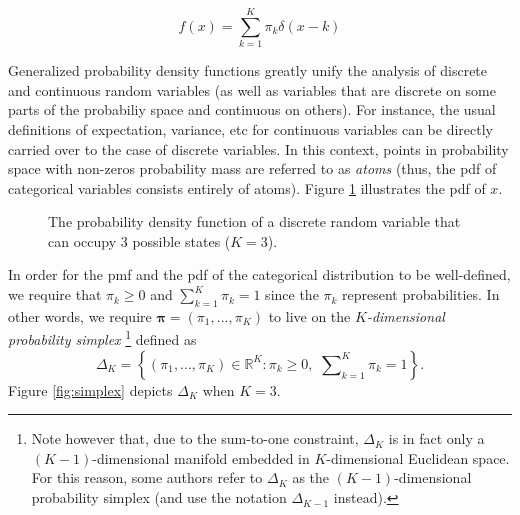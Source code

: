 \documentclass[final,3p,times,twocolumn]{elsarticle}
\let\bs\boldsymbol
\begin{document}
\begin{equation}
\label{eqn:catpdf}
f(x) = \sum_{k=1}^K \pi_k \delta(x - k)
\end{equation}

Generalized probability density functions greatly unify the analysis of discrete and continuous random variables (as well as variables that are discrete on some parts of the probabiliy space and continuous on others).
For instance, the usual definitions of expectation, variance, etc for continuous variables can be directly carried over to the case of discrete variables.
In this context, points in probability space with non-zeros probability mass are referred to as \emph{atoms} (thus, the pdf of categorical variables consists entirely of atoms).
Figure \ref{fig:pmf} illustrates the pdf of $x$.

\begin{figure}
\caption{The probability density function of a discrete random variable that can occupy 3 possible states ($K=3$).}
\label{fig:pmf}
\end{figure}

In order for the pmf and the pdf of the categorical distribution to be well-defined, we require that $\pi_k \geq 0$ and $\sum_{k=1}^K \pi_k = 1$ since the $\pi_k$ represent probabilities.
In other words, we require $\bs \pi = (\pi_1,\dots,\pi_K)$ to live on the \emph{$K$-dimensional probability simplex}
\footnote{Note however that, due to the sum-to-one constraint, $\Delta_K$ is in fact only a $(K-1)$-dimensional manifold embedded in $K$-dimensional Euclidean space.
For this reason, some authors refer to $\Delta_K$ as the $(K-1)$-dimensional probability simplex (and use the notation $\Delta_{K-1}$ instead).}
defined as
\begin{equation}
\label{eqn:simplex}
\Delta_K = \left\{(\pi_1,\dots,\pi_K) \in \mathbb{R}^K : \pi_k \geq 0,\,\, \sum \nolimits _{k=1}^K \pi_k = 1\right\}.
\end{equation}
Figure \ref{fig:simplex} depicts $\Delta_K$ when $K=3$.
\end{document}
